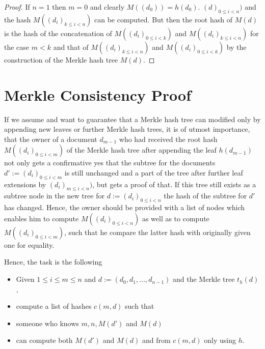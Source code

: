 \begin{proof}
If \(n=1\) then \(m=0\) and clearly \(M((d_0)) = h(d_0)\).
\((d)_{0 \le i < n})\) and the hash \(M((d_i)_{k \le i < n})\)
can be computed. But then the root hash of \(M(d)\) is the hash
of the concatenation of \(M((d_i)_{0 \le i < k})\) and \(M( (d_i)_{k \le i < n})\) 
for the case \(m < k\) and that of 
\(M((d_i)_{k \le i < n})\) and \(M( (d_i)_{0 \le i < k})\) by the
construction of the Merkle hash tree \(M(d)\).
\end{proof}

\section{Merkle Consistency Proof}
If we assume and want to guarantee that a Merkle hash tree can modified only by appending new leaves or 
further Merkle hash trees, it
is of utmost importance, that the owner of a document \(d_{m-1}\) who had received
the root hash \(M((d_i)_{0 \le i < m})\) of the Merkle hash tree after appending
the leaf \(h(d_{m-1})\) not only gets a confirmative yes that the subtree 
for the documents \(d' := (d_i)_{0 \le i < m}\)
is still unchanged and a part of the tree after 
further leaf extensions by \((d_i)_{m \le i < n} )\), but gets a proof of that.
If this tree still exists as a subtree node in the new tree for \(d := (d_i)_{0\le i < n}\)
the hash of the subtree for \(d'\) has changed. Hence, the owner should be provided
with a list of nodes
which enables him to compute \(M((d_i)_{0 \le i < n})\) as well
as to compute \(M((d_i)_{0 \le i < m})\), such that he compare the latter hash with 
originally given one for equality.

Hence, the task is the following
\begin{itemize}
\item 
Given  \(1 \le i \le m \le n\) and \(d := (d_0,d_1,\ldots,d_{n-1})\) and the 
Merkle tree \(t_h(d)\),
\item 
compute a list of hashes \(c(m,d)\) such that
\item
someone who knows \(m,n,M(d')\) and \(M(d)\)
\item
can compute both \(M(d')\) and \(M(d)\) and
from \(c(m,d)\) only using \(h\).
\end{itemize}

